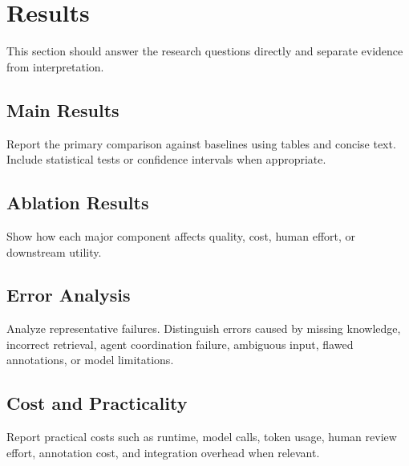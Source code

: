\section{Results}

This section should answer the research questions directly and separate evidence from interpretation.

\subsection{Main Results}

Report the primary comparison against baselines using tables and concise text. Include statistical tests or confidence intervals when appropriate.

\subsection{Ablation Results}

Show how each major component affects quality, cost, human effort, or downstream utility.

\subsection{Error Analysis}

Analyze representative failures. Distinguish errors caused by missing knowledge, incorrect retrieval, agent coordination failure, ambiguous input, flawed annotations, or model limitations.

\subsection{Cost and Practicality}

Report practical costs such as runtime, model calls, token usage, human review effort, annotation cost, and integration overhead when relevant.

